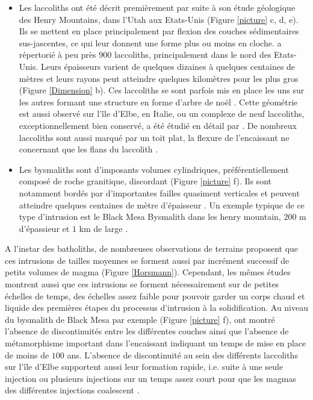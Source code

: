 \begin{itemize}
\item    Les   laccoliths    ont   été    décrit   premièrement    par
  \citet{Gilbert:1877uk}  suite  à  son  étude  géologique  des  Henry
  Mountains, dans  l'Utah aux  Etats-Unis (Figure \ref{picture}  c, d,
  e).  Ils se mettent en  place principalement par flexion des couches
  sédimentaires sus-jascentes, ce  qui leur donnent une  forme plus ou
  moins en  cloche.  \citet{E:2015tl}  a répertorié  à peu  près $900$
  laccoliths,  principalement  dans  le nord  des  Etats-Unis.   Leurs
  épaisseurs  varient de  quelques  dizaines à  quelques centaines  de
  mètres et leurs  rayons peut atteindre quelques  kilomètres pour les
  plus  gros  (Figure  \ref{Dimension}  b).  Ces  laccoliths  se  sont
  parfois mis en place les uns sur les autres formant une structure en
  forme d'arbre  de noël \citep{E:2015tl}.  Cette  géométrie est aussi
  observé  sur  l'île  d'Elbe,  en  Italie, ou  un  complexe  de  neuf
  laccoliths, exceptionnellement bien conservé, a été étudié en détail
  par \citet{Rocchi:2002jy}. De nombreux  laccoliths sont aussi marqué
  par un toit  plat, la flexure de l'encaissant ne  concernant que les
  flans du laccolith \citep{Koch:1981if}.

\item   Les   bysmaliths   sont  d'imposants   volumes   cylindriques,
  préférentiellement composé  de roche granitique,  discordant (Figure
  \ref{picture}  f).   Ils  sont notamment  bordés  par  d'importantes
  failles quasiment verticales et peuvent atteindre quelques centaines
  de mètre  d'épaisseur \citep{Johnson:1973ho}. Un exemple  typique de
  ce  type d'intrusion  est le  Black  Mesa Bysmalith  dans les  henry
  mountain,    $200$   m    d'épassieur   et    $1$   km    de   large
  \citep{Morgan:2008hj}.
\end{itemize}

A  l'instar des  batholiths,  de nombreuses  observations de  terrains
proposent que ces intrusions de  tailles moyennes se forment aussi par
incrément     successif     de     petits     volumes     de     magma
\citep{Habert:2004wg,Horsman:2005ct,Morgan:2008hj}             (Figure
\ref{Horsmann}).  Cependant,  les mêmes études montrent  aussi que ces
intrusions se forment nécessairement sur de petites échelles de temps,
des  échelles assez  faible  pour  pouvoir garder  un  corps chaud  et
liquide   des  premières   étapes  du   processus  d'intrusion   à  la
solidification.   Au niveau  du bysmalith  de Black  Mesa par  exemple
(Figure \ref{picture}  f), \citet{Habert:2004wg} ont  montré l'absence
de discontinuités entre les différentes couches ainsi que l'absence de
métamorphisme important  dans l'encaissant indiquant un  temps de mise
en place de moins de $100$ ans. L'absence de discontinuité au sein des
différents laccoliths sur l'île d'Elbe supportent aussi leur formation
rapide, i.e.  suite à une  seule injection ou plusieurs injections sur
un temps  assez court pour  que les magmas des  différentes injections
coalescent \citep{Roni:2014gt}.

